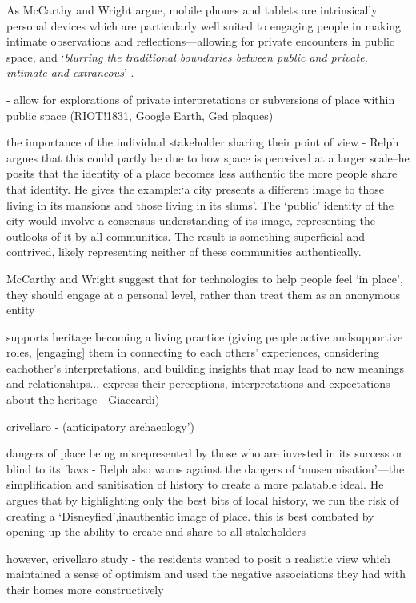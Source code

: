 As McCarthy and Wright argue, mobile phones and tablets are intrinsically personal devices which are particularly well suited to engaging people in making intimate observations and reflections---allowing for private encounters in public space, and `\textit{blurring the traditional boundaries between public and private, intimate and extraneous}' \citep{McCarthy2005}. 

    - allow for explorations of private interpretations or subversions of place within public space (RIOT!1831, Google Earth, Ged plaques)


the importance of the individual stakeholder sharing their point of view - Relph argues that this could partly be due to how space is perceived at a larger scale–he posits that the identity of a place becomes less authentic the more people share that identity.  He gives the example:‘a city presents a different image to those living in its mansions and those living in its slums’. The ‘public’ identity of the city would involve a consensus understanding of its image, representing the outlooks of it by all communities. The result is something superficial and contrived, likely representing neither of these communities authentically.

McCarthy and Wright suggest that for technologies to help people feel ‘in place’, they should engage at a personal level, rather than treat them as an anonymous entity

supports heritage becoming a living practice (giving people active andsupportive roles, [engaging] them in connecting to each others’ experiences, considering eachother’s interpretations, and building insights that may lead to new meanings and relationships... express their perceptions, interpretations and expectations about the heritage - Giaccardi)

crivellaro - (anticipatory archaeology’)

dangers of place being misrepresented by those who are invested in its success or blind to its flaws -  Relph also warns against the dangers of ‘museumisation’—the simplification and sanitisation of history to create a more palatable ideal.  He argues that by highlighting only the best bits of local history, we run the risk of creating a ‘Disneyfied’,inauthentic image of place.
this is best combated by opening up the ability to create and share to all stakeholders

however, crivellaro study - the residents wanted to posit a realistic view which maintained a sense of optimism and used the negative associations they had with their homes more constructively

